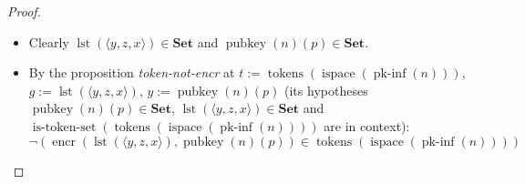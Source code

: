 \documentclass[11pt]{article}
\theoremstyle{plain}
\begin{document}
\begin{proof}
\begin{itemize}[leftmargin=2.8em, itemsep=4pt, parsep=1pt]
\begin{itemize}[leftmargin=2.8em, itemsep=4pt, parsep=1pt]
  \item[\textbf{212--213}] Clearly $\operatorname{lst}(\langle y, z, x \rangle) \in \mathbf{Set}$ and $\operatorname{pubkey}(n)(p) \in \mathbf{Set}$.
  \item[\textbf{214}] By the proposition \emph{token-not-encr} at $t := \operatorname{tokens}(\operatorname{ispace}(\operatorname{pk\text{-}inf}(n)))$, $g := \operatorname{lst}(\langle y, z, x \rangle)$, $y := \operatorname{pubkey}(n)(p)$ (its hypotheses $\operatorname{pubkey}(n)(p) \in \mathbf{Set}$, $\operatorname{lst}(\langle y, z, x \rangle) \in \mathbf{Set}$ and $\operatorname{is\text{-}token\text{-}set}(\operatorname{tokens}(\operatorname{ispace}(\operatorname{pk\text{-}inf}(n))))$ are in context):
\begin{equation*}
\neg (\operatorname{encr}(\operatorname{lst}(\langle y, z, x \rangle), \operatorname{pubkey}(n)(p)) \in \operatorname{tokens}(\operatorname{ispace}(\operatorname{pk\text{-}inf}(n))))
\end{equation*}


\end{itemize}
\end{itemize}
\end{proof}
\end{document}
